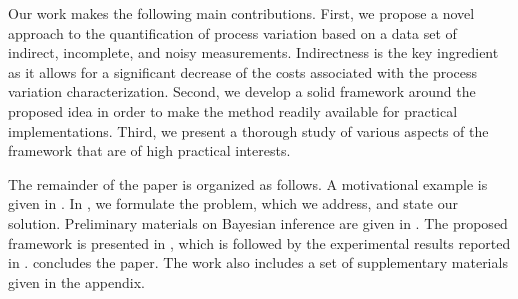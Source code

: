 Our work makes the following main contributions. First, we propose a novel approach to the quantification of process variation based on a data set of indirect, incomplete, and noisy measurements. Indirectness is the key ingredient as it allows for a significant decrease of the costs associated with the process variation characterization. Second, we develop a solid framework around the proposed idea in order to make the method readily available for practical implementations. Third, we present a thorough study of various aspects of the framework that are of high practical interests.

The remainder of the paper is organized as follows. A motivational example is given in . In , we formulate the problem, which we address, and state our solution. Preliminary materials on Bayesian inference are given in . The proposed framework is presented in , which is followed by the experimental results reported in .  concludes the paper. The work also includes a set of supplementary materials given in the appendix.
